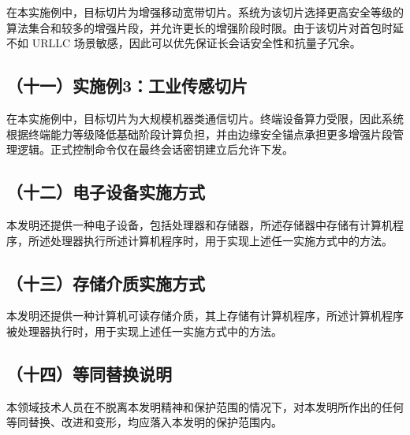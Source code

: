 \documentclass[12pt,a4paper]{article}
\begin{document}
在本实施例中，目标切片为增强移动宽带切片。系统为该切片选择更高安全等级的算法集合和较多的增强片段，并允许更长的增强阶段时限。由于该切片对首包时延不如 URLLC 场景敏感，因此可以优先保证长会话安全性和抗量子冗余。

\subsection*{（十一）实施例3：工业传感切片}

在本实施例中，目标切片为大规模机器类通信切片。终端设备算力受限，因此系统根据终端能力等级降低基础阶段计算负担，并由边缘安全锚点承担更多增强片段管理逻辑。正式控制命令仅在最终会话密钥建立后允许下发。

\subsection*{（十二）电子设备实施方式}

本发明还提供一种电子设备，包括处理器和存储器，所述存储器中存储有计算机程序，所述处理器执行所述计算机程序时，用于实现上述任一实施方式中的方法。

\subsection*{（十三）存储介质实施方式}

本发明还提供一种计算机可读存储介质，其上存储有计算机程序，所述计算机程序被处理器执行时，用于实现上述任一实施方式中的方法。

\subsection*{（十四）等同替换说明}

本领域技术人员在不脱离本发明精神和保护范围的情况下，对本发明所作出的任何等同替换、改进和变形，均应落入本发明的保护范围内。
\end{document}
